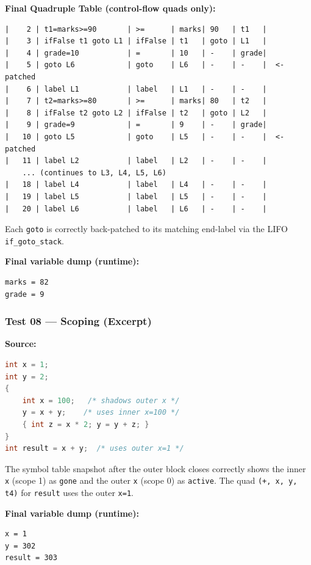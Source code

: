 \documentclass[11pt]{article}
\begin{document}
\textbf{Final Quadruple Table (control-flow quads only):}
\begin{lstlisting}[style=outputstyle]
|    2 | t1=marks>=90       | >=      | marks| 90   | t1   |
|    3 | ifFalse t1 goto L1 | ifFalse | t1   | goto | L1   |
|    4 | grade=10           | =       | 10   | -    | grade|
|    5 | goto L6            | goto    | L6   | -    | -    |  <- patched
|    6 | label L1           | label   | L1   | -    | -    |
|    7 | t2=marks>=80       | >=      | marks| 80   | t2   |
|    8 | ifFalse t2 goto L2 | ifFalse | t2   | goto | L2   |
|    9 | grade=9            | =       | 9    | -    | grade|
|   10 | goto L5            | goto    | L5   | -    | -    |  <- patched
|   11 | label L2           | label   | L2   | -    | -    |
    ... (continues to L3, L4, L5, L6)
|   18 | label L4           | label   | L4   | -    | -    |
|   19 | label L5           | label   | L5   | -    | -    |
|   20 | label L6           | label   | L6   | -    | -    |
\end{lstlisting}

Each \texttt{goto} is correctly back-patched to its matching end-label via the LIFO \texttt{if\_goto\_stack}.

\textbf{Final variable dump (runtime):}
\begin{lstlisting}[style=outputstyle]
marks = 82
grade = 9
\end{lstlisting}

\subsubsection{Test 08 --- Scoping (Excerpt)}

\textbf{Source:}
\begin{lstlisting}[style=cstyle, language=C]
int x = 1;
int y = 2;
{
    int x = 100;   /* shadows outer x */
    y = x + y;    /* uses inner x=100 */
    { int z = x * 2; y = y + z; }
}
int result = x + y;  /* uses outer x=1 */
\end{lstlisting}

The symbol table snapshot after the outer block closes correctly shows the inner \texttt{x} (scope 1) as \texttt{gone} and the outer \texttt{x} (scope 0) as \texttt{active}. The quad \texttt{(+, x, y, t4)} for \texttt{result} uses the outer \texttt{x=1}.

\textbf{Final variable dump (runtime):}
\begin{lstlisting}[style=outputstyle]
x = 1
y = 302
result = 303
\end{lstlisting}
\end{document}
